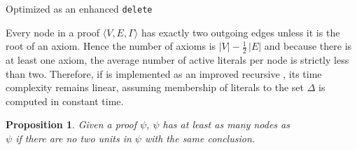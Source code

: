 \documentclass{easychair}
\newtheorem{proposition}{Proposition}
\begin{document}
\begin{algorithm}[pbt]
{%
  }
  \BlankLine


  \caption{Optimized {\LowerUnivalents} as an enhanced \texttt{delete}}
  \label{algo:fullLUniv}
\end{algorithm}


Every node in a proof $\langle V, E, \Gamma \rangle$ has exactly two outgoing edges unless it is the
root of an axiom. Hence the number of axioms is $|V| - \frac{1}{2}\,|E|$ and because there is at
least one axiom, the average number of active literals per node is strictly less than two.
Therefore, if {\LowerUnivalents} is implemented as an improved recursive , its time
complexity remains linear, assuming membership of literals to the set $\Delta$ is computed in constant
time.

\begin{proposition} \label{prop:compression}
Given a proof $\psi$,
{\LowerUnits\unskip\FuncSty{(}$\psi$\FuncSty{)}}
has at least as many nodes as \\
{\LowerUnivalents\unskip\FuncSty{(}$\psi$\FuncSty{)}}
if there are no two units in $\psi$ with the same conclusion.
\end{proposition}

\end{document}
